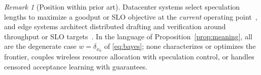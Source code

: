 \documentclass[11pt]{article}
\theoremstyle{definition}
\theoremstyle{remark}
\newtheorem{remark}{Remark}
\begin{document}
\begin{remark}[Position within prior art]
Datacenter systems select speculation lengths to maximize a goodput or SLO
objective at the \emph{current} operating
point~\cite{liu2024smartspec,li2025adaserve,adaspec2025,banditspec2025}, and
edge systems architect distributed drafting and verification around
throughput or SLO
targets~\cite{sled2025,dsd2025,dssd2025,wisp2026,configspec2026}. In the
language of Proposition~\ref{prop:meaning}, all are the degenerate case
$w=\delta_{x_0}$ of \eqref{eq:bayes}; none characterizes or optimizes the
frontier, couples wireless resource allocation with speculation control, or
handles censored acceptance learning with guarantees.
\end{remark}

\end{document}
